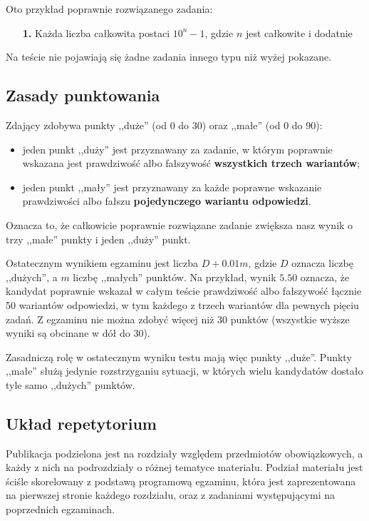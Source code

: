 Oto przykład poprawnie rozwiązanego zadania:
\begin{enumerate}
    \item[\sf\textbf{1.}] Każda liczba całkowita postaci $10^n - 1$, gdzie $n$ jest całkowite i dodatnie
\end{enumerate}

Na teście nie pojawiają się żadne zadania innego typu niż wyżej pokazane.

\subsection{Zasady punktowania}

Zdający zdobywa punkty ,,duże'' (od 0 do 30) oraz ,,małe'' (od 0 do 90):
\begin{itemize}
    \item jeden punkt ,,duży'' jest przyznawany za zadanie, w którym poprawnie wskazana jest prawdziwość albo fałszywość \textbf{wszystkich trzech wariantów};
    \item jeden punkt ,,mały'' jest przyznawany za każde poprawne wskazanie prawdziwości albo fałszu \textbf{pojedynczego wariantu odpowiedzi}.
\end{itemize}
Oznacza to, że całkowicie poprawnie rozwiązane zadanie zwiększa nasz wynik o trzy ,,małe'' punkty i jeden ,,duży'' punkt.

Ostatecznym wynikiem egzaminu jest liczba $D + 0.01m$, gdzie $D$ oznacza liczbę ,,dużych'', a $m$ liczbę ,,małych'' punktów. Na przykład, wynik $5.50$ oznacza, że kandydat poprawnie wskazał w całym teście prawdziwość albo fałszywość łącznie 50 wariantów odpowiedzi, w tym każdego z trzech wariantów dla pewnych pięciu zadań. Z egzaminu nie można zdobyć więcej niż 30 punktów (wszystkie wyższe wyniki są obcinane w dół do 30).

Zasadniczą rolę w ostatecznym wyniku testu mają więc punkty ,,duże''. Punkty ,,małe'' służą jedynie rozstrzyganiu sytuacji, w których wielu kandydatów dostało tyle samo ,,dużych'' punktów.

\subsection{Układ repetytorium}

Publikacja podzielona jest na rozdziały względem przedmiotów obowiązkowych, a każdy z nich na podrozdziały o różnej tematyce materiału. Podział materiału jest ściśle skorelowany z podstawą programową egzaminu, która jest zaprezentowana na pierwszej stronie każdego rozdziału, oraz z zadaniami występującymi na poprzednich egzaminach.


